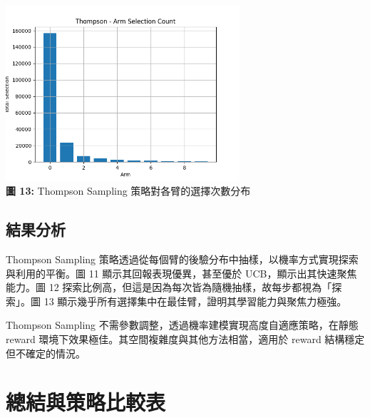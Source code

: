 \documentclass{article}
\begin{document}
\begin{center}
\includegraphics[width=0.65\textwidth]{./plots/thompson_armcount.png} \\
\textbf{圖 13:} Thompson Sampling 策略對各臂的選擇次數分布
\end{center}

\subsection*{結果分析}
Thompson Sampling 策略透過從每個臂的後驗分布中抽樣，以機率方式實現探索與利用的平衡。圖 11 顯示其回報表現優異，甚至優於 UCB，顯示出其快速聚焦能力。圖 12 探索比例高，但這是因為每次皆為隨機抽樣，故每步都視為「探索」。圖 13 顯示幾乎所有選擇集中在最佳臂，證明其學習能力與聚焦力極強。

Thompson Sampling 不需參數調整，透過機率建模實現高度自適應策略，在靜態 reward 環境下效果極佳。其空間複雜度與其他方法相當，適用於 reward 結構穩定但不確定的情況。


\newpage

\section{總結與策略比較表}
\end{document}
